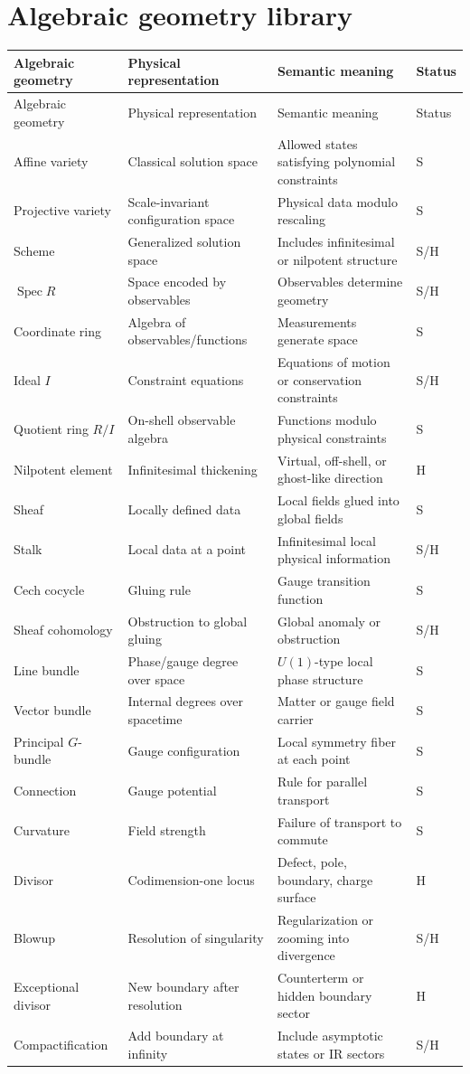 \documentclass[11pt]{article}
\newcommand{\Spec}{\operatorname{Spec}}
\newcommand{\status}[1]{\textsf{#1}}
\newcommand{\entry}[4]{#1 & #2 & #3 & \status{#4}\\}
\begin{document}
\section{Algebraic geometry library}
\begin{longtable}{@{}>{\raggedright\arraybackslash}p{}>{\raggedright\arraybackslash}p{}>{\raggedright\arraybackslash}p{}>{\centering\arraybackslash}p{}@{}}
\toprule
Algebraic geometry & Physical representation & Semantic meaning & Status\\
\midrule
\endfirsthead
\toprule
Algebraic geometry & Physical representation & Semantic meaning & Status\\
\midrule
\endhead
\bottomrule
\endfoot
\entry{Affine variety}{Classical solution space}{Allowed states satisfying polynomial constraints}{S}
\entry{Projective variety}{Scale-invariant configuration space}{Physical data modulo rescaling}{S}
\entry{Scheme}{Generalized solution space}{Includes infinitesimal or nilpotent structure}{S/H}
\entry{$\Spec R$}{Space encoded by observables}{Observables determine geometry}{S/H}
\entry{Coordinate ring}{Algebra of observables/functions}{Measurements generate space}{S}
\entry{Ideal $I$}{Constraint equations}{Equations of motion or conservation constraints}{S/H}
\entry{Quotient ring $R/I$}{On-shell observable algebra}{Functions modulo physical constraints}{S}
\entry{Nilpotent element}{Infinitesimal thickening}{Virtual, off-shell, or ghost-like direction}{H}
\entry{Sheaf}{Locally defined data}{Local fields glued into global fields}{S}
\entry{Stalk}{Local data at a point}{Infinitesimal local physical information}{S/H}
\entry{Cech cocycle}{Gluing rule}{Gauge transition function}{S}
\entry{Sheaf cohomology}{Obstruction to global gluing}{Global anomaly or obstruction}{S/H}
\entry{Line bundle}{Phase/gauge degree over space}{$U(1)$-type local phase structure}{S}
\entry{Vector bundle}{Internal degrees over spacetime}{Matter or gauge field carrier}{S}
\entry{Principal $G$-bundle}{Gauge configuration}{Local symmetry fiber at each point}{S}
\entry{Connection}{Gauge potential}{Rule for parallel transport}{S}
\entry{Curvature}{Field strength}{Failure of transport to commute}{S}
\entry{Divisor}{Codimension-one locus}{Defect, pole, boundary, charge surface}{H}
\entry{Blowup}{Resolution of singularity}{Regularization or zooming into divergence}{S/H}
\entry{Exceptional divisor}{New boundary after resolution}{Counterterm or hidden boundary sector}{H}
\entry{Compactification}{Add boundary at infinity}{Include asymptotic states or IR sectors}{S/H}

\end{longtable}
\end{document}
